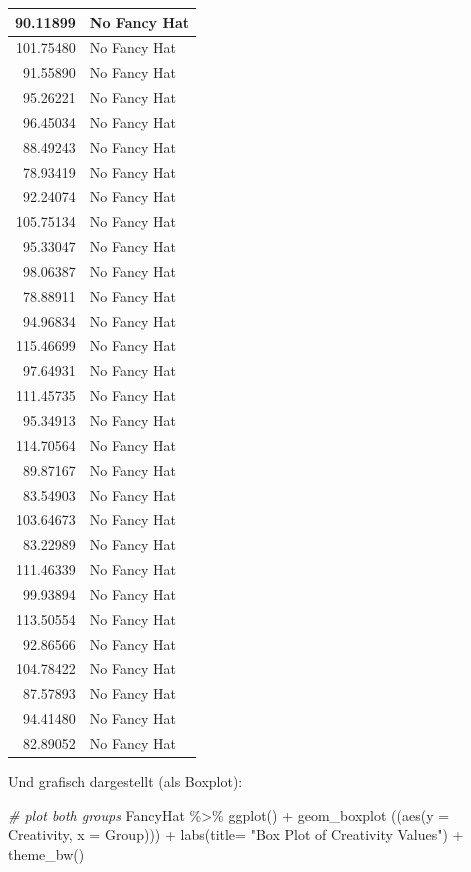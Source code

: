 \documentclass[]{tufte-handout}
\newenvironment{Shaded}{}{}
\newcommand{\AttributeTok}[1]{\textcolor[rgb]{0.49,0.56,0.16}{#1}}
\newcommand{\CommentTok}[1]{\textcolor[rgb]{0.38,0.63,0.69}{\textit{#1}}}
\newcommand{\FunctionTok}[1]{\textcolor[rgb]{0.02,0.16,0.49}{#1}}
\newcommand{\NormalTok}[1]{#1}
\newcommand{\SpecialCharTok}[1]{\textcolor[rgb]{0.25,0.44,0.63}{#1}}
\newcommand{\StringTok}[1]{\textcolor[rgb]{0.25,0.44,0.63}{#1}}
\begin{document}
\begin{table}
\begin{tabular}[t]{r|l}
90.11899 & No Fancy Hat\\
\hline
101.75480 & No Fancy Hat\\
\hline
91.55890 & No Fancy Hat\\
\hline
95.26221 & No Fancy Hat\\
\hline
96.45034 & No Fancy Hat\\
\hline
88.49243 & No Fancy Hat\\
\hline
78.93419 & No Fancy Hat\\
\hline
92.24074 & No Fancy Hat\\
\hline
105.75134 & No Fancy Hat\\
\hline
95.33047 & No Fancy Hat\\
\hline
98.06387 & No Fancy Hat\\
\hline
78.88911 & No Fancy Hat\\
\hline
94.96834 & No Fancy Hat\\
\hline
115.46699 & No Fancy Hat\\
\hline
97.64931 & No Fancy Hat\\
\hline
111.45735 & No Fancy Hat\\
\hline
95.34913 & No Fancy Hat\\
\hline
114.70564 & No Fancy Hat\\
\hline
89.87167 & No Fancy Hat\\
\hline
83.54903 & No Fancy Hat\\
\hline
103.64673 & No Fancy Hat\\
\hline
83.22989 & No Fancy Hat\\
\hline
111.46339 & No Fancy Hat\\
\hline
99.93894 & No Fancy Hat\\
\hline
113.50554 & No Fancy Hat\\
\hline
92.86566 & No Fancy Hat\\
\hline
104.78422 & No Fancy Hat\\
\hline
87.57893 & No Fancy Hat\\
\hline
94.41480 & No Fancy Hat\\
\hline
82.89052 & No Fancy Hat\\
\hline
\end{tabular}
\end{table}

Und grafisch dargestellt (als Boxplot):

\begin{Shaded}
\begin{Highlighting}[]
\CommentTok{\# plot both groups}
\NormalTok{FancyHat }\SpecialCharTok{\%\textgreater{}\%} 
    \FunctionTok{ggplot}\NormalTok{() }\SpecialCharTok{+}
    \FunctionTok{geom\_boxplot}\NormalTok{ ((}\FunctionTok{aes}\NormalTok{(}\AttributeTok{y =}\NormalTok{ Creativity, }\AttributeTok{x =}\NormalTok{ Group))) }\SpecialCharTok{+}
    \FunctionTok{labs}\NormalTok{(}\AttributeTok{title=} \StringTok{"Box Plot of Creativity Values"}\NormalTok{) }\SpecialCharTok{+}
    \FunctionTok{theme\_bw}\NormalTok{()}
\end{Highlighting}
\end{Shaded}
\end{document}
